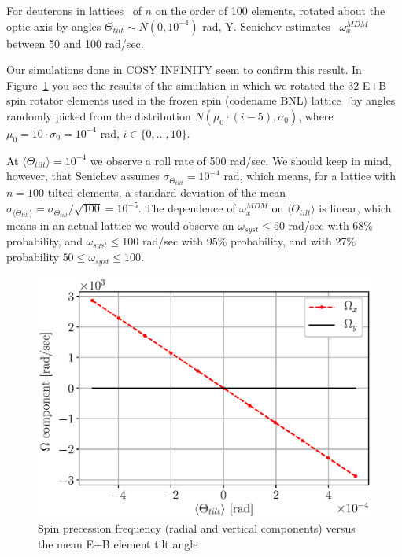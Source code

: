\documentclass[]{elsarticle}
\newcommand{\w}{\omega}
\newcommand{\avg}[1]{\langle{#1}\rangle}
\begin{document}
For deuterons in lattices~\cite{Senichev:Lattices} of $n$ on the order of 100 elements, rotated about the
optic axis by angles $\Theta_{tilt}\sim N(0, 10^{-4})$ rad, Y. Senichev estimates~\cite{Senichev:FDM}
$\w_x^{MDM}$ between 50 and 100 rad/sec. 

Our simulations done in COSY INFINITY seem to confirm this result. In 
Figure~\ref{fig:imperfections:SW_roll_rate} you see the results of the simulation 
in which we rotated the 32 E+B spin rotator elements used in the frozen spin 
(codename BNL) lattice~\cite{Senichev:Lattices} by angles randomly picked from
the distribution $N(\mu_0\cdot(i-5), \sigma_0)$, where $\mu_0 = 10\cdot\sigma_0 = 10^{-4}$ rad,
$i\in\lbrace0,\dots, 10\rbrace$.

At $\avg{\Theta_{tilt}} = 10^{-4}$ we observe a roll rate of 500 rad/sec. We should keep in mind,  however, that 
Senichev assumes $\sigma_{\Theta_{tilt}} = 10^{-4}$ rad, which means, for a lattice with $n=100$ tilted elements,
a standard deviation of the mean $\sigma_{\avg{\Theta_{tilt}}} = {\sigma_{\Theta_{tilt}}}/{\sqrt{100}} = 10^{-5}$. The dependence of $\w_x^{MDM}$ on $\avg{\Theta_{tilt}}$
is linear, which means in an actual lattice we would observe an $\w_{syst} \le 50$ rad/sec with 68\% probability,
and $\w_{syst} \le 100$ rad/sec with 95\% probability, and with 27\% probability $50 \le\w_{syst}\le 100$.

\begin{figure}[ht]\centering
  \includegraphics[width=\linewidth]{Figures/linearity_test_shifting_gauss_freq.eps}
  \caption{Spin precession frequency (radial and vertical components) versus
    the mean E+B element tilt angle\label{fig:imperfections:SW_roll_rate}}
\end{figure}
\end{document}
